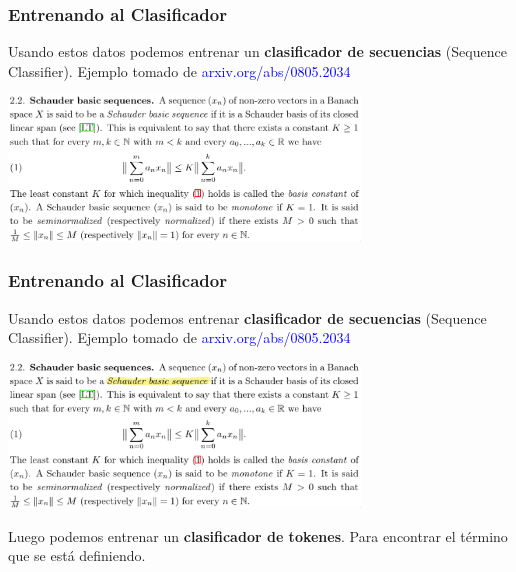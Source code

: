 \documentclass[10pt]{beamer}
\begin{document}
\begin{frame}[fragile]
\begin{itemize}
\begin{columns}
\begin{column}{0.6\textwidth}
        \end{column}
    \end{columns}

\end{itemize}
\end{frame}


\begin{frame}
    \frametitle{Entrenando al Clasificador}
    Usando estos datos podemos entrenar un \textbf{clasificador de secuencias} (Sequence Classifier). \pause Ejemplo tomado de \textcolor{blue}{arxiv.org/abs/0805.2034}
    \begin{center}
        \includegraphics[width=0.7\textwidth]{../Images/def2.png}
    \end{center}
\end{frame}

\begin{frame}
    \frametitle{Entrenando al Clasificador}
    Usando estos datos podemos entrenar \textbf{clasificador de secuencias} (Sequence Classifier). Ejemplo tomado de \textcolor{blue}{arxiv.org/abs/0805.2034}
    \begin{center}
        \includegraphics[width=0.7\textwidth]{../Images/def_highlighted.png}
    \end{center}
    Luego podemos entrenar un \textbf{clasificador de tokenes}. Para encontrar el término que se está definiendo.
\end{frame}
\end{document}
